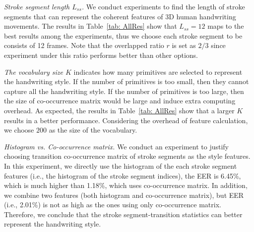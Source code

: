  \textit{Stroke segment length $L_{ss}$.}  We conduct experiments to find the length of stroke segments that can represent the coherent features of 3D human handwriting movements. The results in Table~\ref{tab: AllRes} show that $L_{ss} = 12$ maps to the best results among the experiments, thus we choose each stroke segment to be consists of 12 frames. Note that the overlapped ratio $r$ is set as $2/3$ since experiment under this ratio performs better than other options. 

 \textit{The vocabulary size $K$} indicates how many primitives are selected to represent the handwriting style. If the number of primitives is too small, then they cannot capture all the handwriting style. If the number of primitives is too large, then the size of co-occurrence matrix would be large and induce extra computing overhead. As expected, the results in Table~\ref{tab: AllRes} show that a larger $K$ results in a better performance. Considering the overhead of feature calculation, we choose $200$ as the size of the vocabulary. 

\textit{Histogram vs. Co-occurrence matrix.} We conduct an
experiment to justify choosing transition co-occurrence matrix
of stroke segments as the style features. In this experiment, we
directly use the histogram of the each  stroke segment
features (i.e., the histogram of the stroke segment indices), the EER is 6.45\%, which is much higher
than 1.18\%, which uses co-occurrence matrix. In addition, we combine two features (both histogram and co-occurrence matrix), but EER (i.e., 2.01\%) is not as high as the ones using only co-occurrence matrix. Therefore, we conclude that the stroke segment-transition statistics can better represent the handwriting style.








